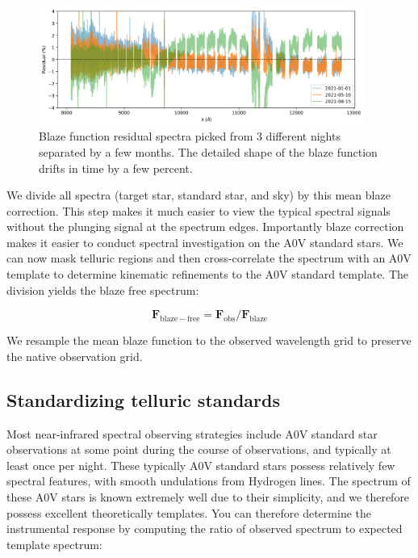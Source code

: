 \documentclass[modern]{aastex631}
\begin{document}
\begin{figure}[ht]
  \centering
  \includegraphics[width=0.95\textwidth]{figures/HPF_blaze_function_variation.png}
\caption{Blaze function residual spectra picked from 3 different nights separated by a few months.  The detailed shape of the blaze function drifts in time by a few percent.}
\label{fig:blaze_variation}
\end{figure}

We divide all spectra (target star, standard star, and sky) by this mean blaze correction.  This step makes it much easier to view the typical spectral signals without the plunging signal at the spectrum edges.  Importantly blaze correction makes it easier to conduct spectral investigation on the A0V standard stars.  We can now mask telluric regions and then cross-correlate the spectrum with an A0V template to determine kinematic refinements to the A0V standard template.  The division yields the blaze free spectrum:

\begin{equation} \label{blaze_correction}
\mathbf{F}_{\mathrm{blaze-free}} = \mathbf{F}_{\mathrm{obs}}/ \mathbf{F}_{\mathrm{blaze}}
\end{equation}

We resample the mean blaze function to the observed wavelength grid to preserve the native observation grid.


\subsection{Standardizing telluric standards}
Most near-infrared spectral observing strategies include A0V standard star observations at some point during the course of observations, and typically at least once per night.  These typically A0V standard stars possess relatively few spectral features, with smooth undulations from Hydrogen lines.  The spectrum of these A0V stars is known extremely well due to their simplicity, and we therefore possess excellent theoretically templates.  You can therefore determine the instrumental response by computing the ratio of observed spectrum to expected template spectrum:
\end{document}
